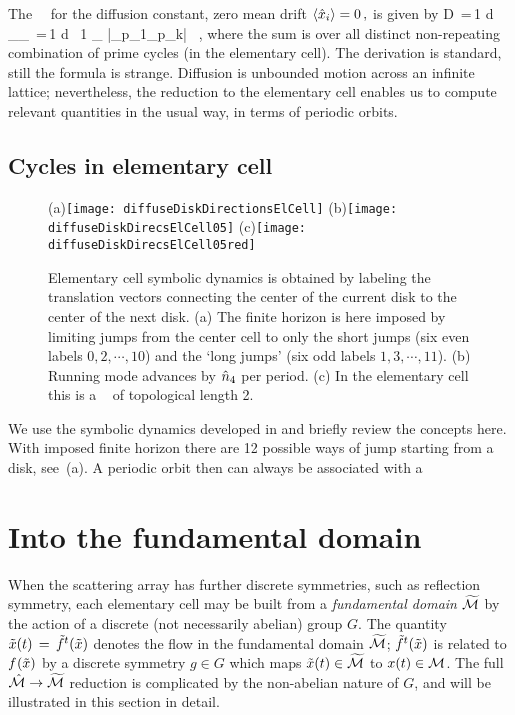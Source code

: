 \documentclass[aps,pre,
                showpacs,
                twocolumn,
                groupedaddress,
                floatfix]{revtex4-1}
\begin{document}
The \dzeta\ \cycForm\ for the diffusion constant, zero mean drift
$ \left\langle { \hat{x}_i } \right\rangle = 0 \,, $ is given by
 \beq D \,=\,{1  d}
{ _\zeta \over \expct{\period{}}_\zeta } \,=\,{1
   d } \, {1 \over \expct{\period{}}_\zeta} \sumprime
{}
{|\ExpaEig_{p_1}\cdots \ExpaEig_{p_k}|} \, ,
\label{(17)}
\eeq
where the sum is over all distinct non-repeating combination of prime cycles (in
the elementary cell). The derivation is standard, still the formula is strange.
Diffusion is unbounded motion across an infinite lattice; nevertheless, the
reduction to the elementary cell enables us to compute relevant quantities in
the usual way, in terms of periodic orbits.

\subsection{Cycles in elementary cell}
\begin{figure}
  \begin{center}
    (a)\texttt{[image: diffuseDiskDirectionsElCell]}
    (b)\texttt{[image: diffuseDiskDirecsElCell05]}
    (c)\texttt{[image: diffuseDiskDirecsElCell05red]}
  \end{center}
  \caption{ Elementary cell symbolic dynamics is obtained by labeling the
  translation vectors connecting the center of the current disk to the center of
  the next disk. (a) The finite horizon is here imposed by limiting jumps from
  the center cell to only the short jumps (six even labels $0, 2,\cdots,10$) and
  the `long jumps' (six odd labels $1, 3,\cdots,11$). (b) Running mode
   advances by $\hat n_4$ per period. (c) In the elementary cell this is
  a \po\  of topological length 2.  }
  \label{fig-diskDirectionsElCell}
\end{figure}

We use the symbolic dynamics developed in  and briefly review the
concepts here. With imposed finite horizon there are 12 possible ways of jump
starting from a disk, see \,(a). A periodic
orbit then can always be associated with a


\section{Into the fundamental domain}
\label{s-SymmetryReduction}

When the scattering array has further discrete symmetries, such as reflection
symmetry, each elementary cell may be built from a {\em fundamental domain}
${\widetilde {{\cal M}}}$ by the action of a discrete (not necessarily abelian) group
$G$. The quantity $\tilde x(t)\,=\,{\tilde{f}^{t}(\tilde x)}$ denotes the flow in the
fundamental domain ${\widetilde {{\cal M}}}$; ${\tilde{f}^{t}(\tilde x)}$ is related to
${f^{}(\tilde x)}$ by a discrete symmetry $g \in G$ which maps $\tilde x(t)\in
{\widetilde {\ensuremath{{\cal M}}}}$ to ${x}(t) \in {\ensuremath{{\cal M}}}$. The full $\hat {{\cal M}} \rightarrow {\widetilde
{\ensuremath{{\cal M}}}}$ reduction is complicated by the non-abelian nature of $G$, and will be
illustrated in this section in detail.
\end{document}

